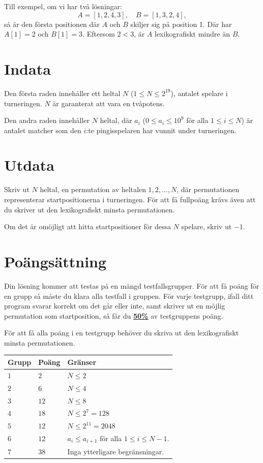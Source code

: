 Till exempel, om vi har två lösningar:  
$$
A = [1, 2, 4, 3], \quad B = [1, 3, 2, 4],  
$$  
så är den första positionen där $A$ och $B$ skiljer sig på position 1. Där har $A[1] = 2$ och $B[1] = 3$.
Eftersom $2 < 3$, är $A$ lexikografiskt mindre än $B$.  


\section*{Indata}
Den första raden innehåller ett heltal $N$ ($1 \leq N \leq 2^{19}$), antalet spelare i turneringen.
$N$ är garanterat att vara en tvåpotens.

Den andra raden innehåller $N$ heltal, där $a_i$ ($0 \leq a_i \leq 10^9$ för alla $1 \leq i \leq N$) är antalet
matcher som den $i$:te pingisspelaren har vunnit under turneringen.

\section*{Utdata}
Skriv ut $N$ heltal, en permutation av heltalen $1,2,\ldots, N$, där permutationen representerar startpositionerna i turneringen.
För att få fullpoäng krävs även att du skriver ut den lexikografiskt minsta permutationen.

Om det är omöjligt att hitta startpositioner för dessa $N$ spelare, skriv ut $-1$.

\section*{Poängsättning}
Din lösning kommer att testas på en mängd testfallsgrupper.
För att få poäng för en grupp så måste du klara alla testfall i gruppen.
För varje testgrupp, ifall ditt program svarar korrekt om det går eller inte, 
samt skriver ut en möjlig permutation som startposition, så får du \underline{\textbf{50\%}} av testgruppens poäng.

För att få alla poäng i en testgrupp behöver du skriva ut den lexikografiskt minsta permutationen.

\noindent
\begin{tabular}{| l | l | p{12cm} |}
  \hline
  \textbf{Grupp} & \textbf{Poäng} & \textbf{Gränser} \\ \hline
  $1$    & $2$        & $N \leq 2$ \\ \hline
  $2$    & $6$        & $N \leq 4$ \\ \hline
  $3$    & $12$       & $N \leq 8$ \\ \hline
  $4$    & $18$       & $N \leq 2^7 = 128$ \\ \hline
  $5$    & $12$       & $N \leq 2^{11} = 2048$ \\ \hline
  $6$    & $12$       & $a_i \leq a_{i+1}$ för alla $1 \leq i \leq N-1$. \\ \hline 
  $7$    & $38$       & Inga ytterligare begränsningar. \\ \hline %
\end{tabular}


